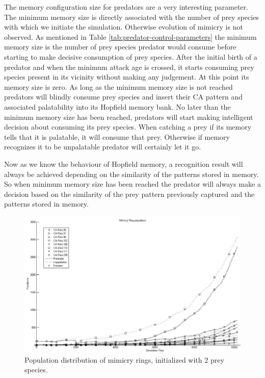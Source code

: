 The memory configuration size for predators are a very interesting parameter. The minimum memory size is directly associated with the number of prey species with which we initiate the simulation. Otherwise evolution of mimicry is not observed. As mentioned in Table \ref{tab:predator-control-parameters} the minimum memory size is the number of prey species predator would consume before starting to make decisive consumption of prey species. After the initial birth of a predator and when the minimum attack age is crossed, it starts consuming prey species present in its vicinity without making any judgement. At this point its memory size is zero. As long as the minimum memory size is not reached predators will blindly consume prey species and insert their CA pattern and associated palatability into its Hopfield memory bank. No later than the minimum memory size has been reached, predators will start making intelligent decision about consuming its prey species. When catching a prey if its memory tells that it is palatable, it will consume that prey. Otherwise if memory recognizes it to be unpalatable predator will certainly let it go.

Now as we know the behaviour of Hopfield memory, a recognition result will always be achieved depending on the similarity of the patterns stored in memory. So when minimum memory size has been reached the predator will always make a decision based on the similarity of the prey pattern previously captured and the patterns stored in memory.

\begin{figure}[H]
	\centering
	\includegraphics[scale=0.50]{images/simTime10k-2Prey}
	\caption{Population distribution of mimicry rings, initialized with 2 prey species.}
	\label{fig:plot-2-prey}
\end{figure}

